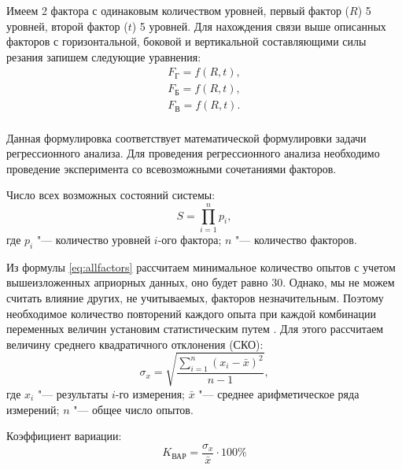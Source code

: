 Имеем 2 фактора с одинаковым количеством уровней, первый фактор ($R$) 5 уровней, второй фактор ($t$) 5 уровней. Для нахождения связи выше описанных факторов с горизонтальной, боковой и вертикальной составляющими силы резания запишем следующие уравнения:
\begin{equation}
\label{eq:regresF}
\begin{alignedat}{2}
	F_\text{Г}=f(R,t),\\
	F_\text{Б}=f(R,t),\\
	F_\text{В}=f(R,t).\\
\end{alignedat}
\end{equation}

Данная формулировка соответствует математической формулировки задачи регрессионного анализа. Для проведения регрессионного анализа необходимо проведение эксперимента со всевозможными сочетаниями факторов.

Число всех возможных состояний системы:
\begin{equation}
\label{eq:allfactors}
S=\prod_{i=1}^n p_i,
\end{equation}
где $ p_i $ "--- количество уровней $i$-ого фактора; 
	$ n $ "--- количество факторов.
	
Из формулы \ref{eq:allfactors} рассчитаем минимальное количество опытов с учетом вышеизложенных априорных данных, оно будет равно 30. Однако, мы не можем считать влияние других, не учитываемых, факторов незначительным. Поэтому необходимое количество повторений каждого опыта при каждой комбинации переменных величин установим статистическим путем \cite{Zelenin}. Для этого рассчитаем величину среднего квадратичного отклонения (СКО):
\begin{equation}
\label{eq:sigma_x}
\sigma_x=\sqrt{\frac{\sum_{i=1}^n (x_i-\bar{x})^2}{n-1}},
\end{equation}
где $ x_i $ "--- результаты $ i $-го измерения;
	$ \bar{x} $ "--- среднее арифметическое ряда измерений;
	$ n $ "--- общее число опытов.

Коэффициент вариации:
\begin{equation}
\label{eq:var}
K_{\text{ВАР}}=\frac{\sigma_x}{\bar{x}}\cdot100\%
\end{equation}

